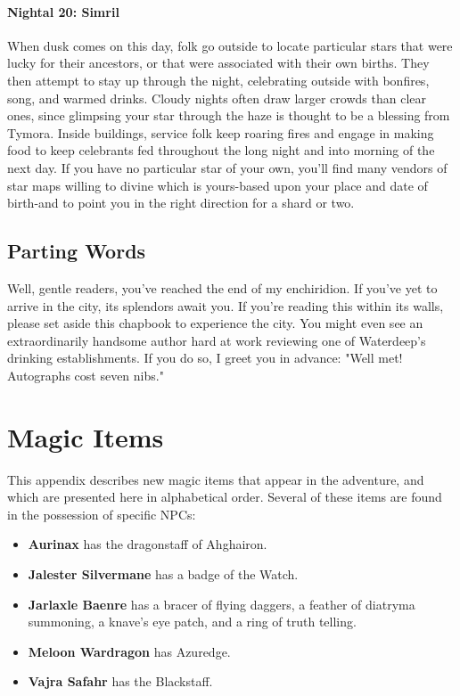 \documentclass[10pt,a4paper,twoside,twocolumn,openany,nodeprecatedcode]{dndbook}
\begin{document}
\subsubsection{Nightal 20: Simril}
When dusk comes on this day, folk go outside to locate particular stars that were lucky for their ancestors, or that were associated with their own births. They then attempt to stay up through the night, celebrating outside with bonfires, song, and warmed drinks. Cloudy nights often draw larger crowds than clear ones, since glimpsing your star through the haze is thought to be a blessing from Tymora. Inside buildings, service folk keep roaring fires and engage in making food to keep celebrants fed throughout the long night and into morning of the next day. If you have no particular star of your own, you'll find many vendors of star maps willing to divine which is yours-based upon your place and date of birth-and to point you in the right direction for a shard or two.
\section{Parting Words}
Well, gentle readers, you've reached the end of my enchiridion. If you've yet to arrive in the city, its splendors await you. If you're reading this within its walls, please set aside this chapbook to experience the city. You might even see an extraordinarily handsome author hard at work reviewing one of Waterdeep's drinking establishments. If you do so, I greet you in advance: "Well met! Autographs cost seven nibs."
\chapter{Magic Items}
This appendix describes new magic items that appear in the adventure, and which are presented here in alphabetical order.
Several of these items are found in the possession of specific NPCs:
\begin{itemize}

\item \textbf{Aurinax} has the dragonstaff of Ahghairon.
\item \textbf{Jalester Silvermane} has a badge of the Watch.
\item \textbf{Jarlaxle Baenre} has a bracer of flying daggers, a feather of diatryma summoning, a knave's eye patch, and a ring of truth telling.
\item \textbf{Meloon Wardragon} has Azuredge.
\item \textbf{Vajra Safahr} has the Blackstaff.
\end{itemize}
\end{document}

